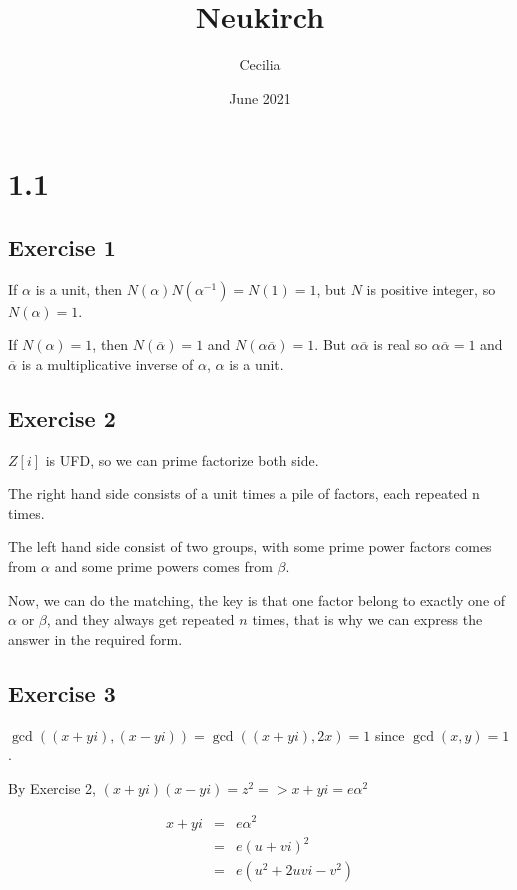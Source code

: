 \documentclass{article}
\title{Neukirch}
\author{Cecilia}
\date{June 2021}
\begin{document}
\maketitle

\section{1.1}
\subsection{Exercise 1}
If $ \alpha $ is a unit, then $ N(\alpha) N(\alpha^{-1}) = N(1) = 1 $, but $ N $ is positive integer, so $ N(\alpha) = 1 $.

If $ N(\alpha) = 1 $, then $ N(\overline{\alpha}) = 1 $ and $ N(\alpha \overline{\alpha}) = 1 $. But $ \alpha \overline{\alpha}$ is real so $ \alpha \overline{\alpha} = 1 $ and $ \overline{\alpha} $ is a multiplicative inverse of $ \alpha $, $ \alpha $ is a unit.

\subsection{Exercise 2}
$ Z[i] $ is UFD, so we can prime factorize both side.

The right hand side consists of a unit times a pile of factors, each repeated n times.

The left hand side consist of two groups, with some prime power factors comes from $ \alpha $ and some prime powers comes from $ \beta $.

Now, we can do the matching, the key is that one factor belong to exactly one of $ \alpha $ or $ \beta $, and they always get repeated $ n $ times, that is why we can express the answer in the required form.

\subsection{Exercise 3}

$ \gcd((x + yi), (x - yi)) = \gcd((x + yi), 2x) = 1 $ since $ \gcd(x, y) = 1 $.

By Exercise 2, $ (x + yi)(x - yi) = z^2 => x + yi = e \alpha^2 $

\begin{eqnarray*}
  x + yi &=& e \alpha^2   \\
         &=& e (u + vi)^2 \\
         &=& e (u^2 + 2uvi -v^2)
\end{eqnarray*}
\end{document}
